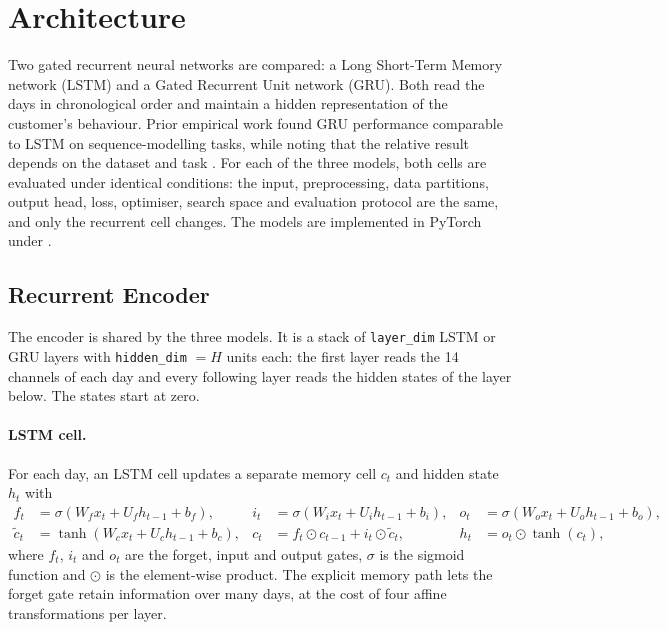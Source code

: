 \documentclass{article}
\begin{document}
\section{Architecture}

Two gated recurrent neural networks are compared: a Long Short-Term Memory network (LSTM) and a Gated Recurrent Unit network (GRU). Both read the days in chronological order and maintain a hidden representation of the customer's behaviour. Prior empirical work found GRU performance comparable to LSTM on sequence-modelling tasks, while noting that the relative result depends on the dataset and task \cite{chung2014}. For each of the three models, both cells are evaluated under identical conditions: the input, preprocessing, data partitions, output head, loss, optimiser, search space and evaluation protocol are the same, and only the recurrent cell changes. The models are implemented in PyTorch under .

\subsection{Recurrent Encoder}

The encoder is shared by the three models. It is a stack of \texttt{layer\_dim} LSTM or GRU layers with \texttt{hidden\_dim} $= H$ units each: the first layer reads the 14 channels of each day and every following layer reads the hidden states of the layer below. The states start at zero.

\paragraph{LSTM cell.} For each day, an LSTM cell updates a separate memory cell $c_t$ and hidden state $h_t$ with
\begin{align}
f_t &= \sigma(W_f x_t + U_f h_{t-1} + b_f), &
i_t &= \sigma(W_i x_t + U_i h_{t-1} + b_i), &
o_t &= \sigma(W_o x_t + U_o h_{t-1} + b_o), \\
\tilde{c}_t &= \tanh(W_c x_t + U_c h_{t-1} + b_c), &
c_t &= f_t \odot c_{t-1} + i_t \odot \tilde{c}_t, &
h_t &= o_t \odot \tanh(c_t),
\end{align}
where $f_t$, $i_t$ and $o_t$ are the forget, input and output gates, $\sigma$ is the sigmoid function and $\odot$ is the element-wise product. The explicit memory path lets the forget gate retain information over many days, at the cost of four affine transformations per layer.
\end{document}
